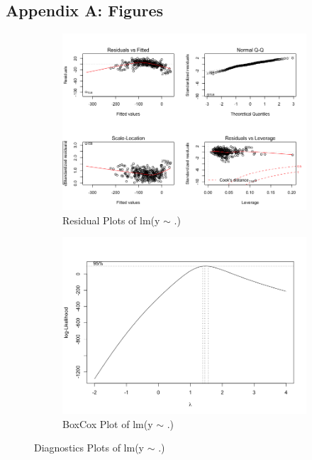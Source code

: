 \documentclass[11pt a4paper]{article}
\begin{document}
\subsection*{Appendix A: Figures}

\begin{figure}[H]
	\centering
	\begin{subfigure}{.7\textwidth}
		\centering
		\includegraphics[scale=0.4]{resid-m0.png}
		\caption{Residual Plots of lm(y $\sim$ .)}
		\label{fig:resid-m0}
	\end{subfigure}%
	\begin{subfigure}{.3\textwidth}
		\centering
		\includegraphics[scale=0.2]{boxcox-m0.png}
		\caption{BoxCox Plot of lm(y $\sim$ .)}
		\label{fig:boxcox-m0}
	\end{subfigure}
	\caption{Diagnostics Plots of lm(y $\sim$ .)}
	\label{fig:diagnostics-m0}
\end{figure}
\end{document}
